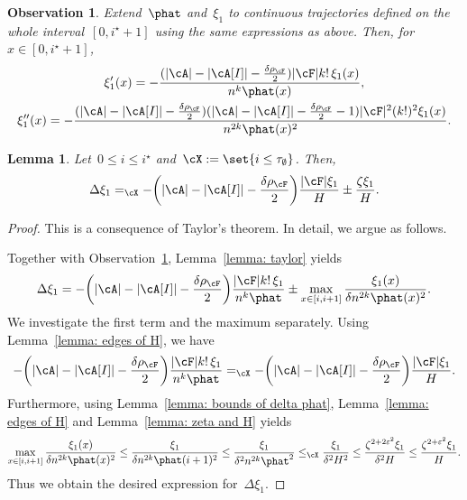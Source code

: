 \documentclass[11pt]{amsart}
\newcommand{\eps}{\varepsilon}
\DeclarePairedDelimiter{\paren}{\lparen}{\rparen}
\DeclarePairedDelimiter{\abs}{\lvert}{\rvert}
\newcommand{\Xleq}{\leq_{\cX}}
\newcommand{\Xeq}{=_{\cX}}
\newtheorem{lemma}[algocf]{Lemma}
\newtheorem{observation}[algocf]{Observation}
\theoremstyle{definition}
\numberwithin{equation}{section}
\begin{document}
	\begin{observation}\label{observation: xi balanced}
		Extend~$\phat$ and~$\xi_1$ to continuous trajectories defined on the whole interval~$[0,i^\star+1]$ using the same expressions as above.
		Then, for~$x\in [0,i^\star+1]$,
		\begin{equation*}
			\begin{gathered}
				\xi_1'(x)=-\frac{(\abs{\cA}-\abs{\cA[I]}-\frac{\delta\rho_\cF}{2})\abs{\cF}k!\,\xi_1(x)}{n^k\phat(x)},\\
				\xi_1''(x)=-\frac{(\abs{\cA}-\abs{\cA[I]}-\frac{\delta\rho_\cF}{2})(\abs{\cA}-\abs{\cA[I]}-\frac{\delta\rho_\cF}{2}-1)\abs{\cF}^2(k!)^2\xi_1(x)}{n^{2k}\phat(x)^2}.
			\end{gathered}
		\end{equation*} 
	\end{observation}
	
	\begin{lemma}\label{lemma: delta xi balanced}
		Let~$0\leq i\leq i^\star$ and~$\cX:=\set{i\leq \tau_\emptyset}$.
		Then,
		\begin{equation*}
			\Delta \xi_1\Xeq-\paren[\bigg]{\abs{\cA}-\abs{\cA[I]}-\frac{\delta\rho_\cF}{2}}\frac{\abs{\cF}\xi_1}{H}\pm \frac{\zeta \xi_1}{H}.
		\end{equation*}
	\end{lemma}
	\begin{proof}
		This is a consequence of Taylor's theorem.
		In detail, we argue as follows.
		
		Together with Observation~\ref{observation: xi balanced}, Lemma~\ref{lemma: taylor} yields
		\begin{equation*}
			\Delta\xi_1 = -\paren[\bigg]{\abs{\cA}-\abs{\cA[I]}-\frac{\delta\rho_\cF}{2}}\frac{\abs{\cF}k!\,\xi_1}{n^k\phat}\pm \max_{x\in[i,i+1]} \frac{\xi_1(x)}{\delta n^{2k}\phat(x)^2}.
		\end{equation*}
		We investigate the first term and the maximum separately.
		Using Lemma~\ref{lemma: edges of H}, we have
		\begin{equation*}
			-\paren[\bigg]{\abs{\cA}-\abs{\cA[I]}-\frac{\delta\rho_\cF}{2}}\frac{\abs{\cF}k!\,\xi_1}{n^k\phat}
			\Xeq-\paren[\bigg]{\abs{\cA}-\abs{\cA[I]}-\frac{\delta\rho_\cF}{2}}\frac{\abs{\cF}\xi_1}{H}.
		\end{equation*}
		Furthermore, using Lemma~\ref{lemma: bounds of delta phat}, Lemma~\ref{lemma: edges of H} and Lemma~\ref{lemma: zeta and H} yields
		\begin{equation*}
			\max_{x\in[i,i+1]} \frac{\xi_1(x)}{\delta n^{2k}\phat(x)^2}
			\leq \frac{\xi_1}{\delta n^{2k}\phat(i+1)^2}
			\leq \frac{\xi_1}{\delta^2 n^{2k}\phat^2}
			\Xleq \frac{\xi_1}{\delta^2 H^2}
			\leq \frac{\zeta^{2+2\eps^2}\xi_1}{\delta^2 H}
			\leq \frac{\zeta^{2+\eps^2}\xi_1}{H}.
		\end{equation*}
		Thus we obtain the desired expression for~$\Delta\xi_1$.
	\end{proof}
	
\end{document}
